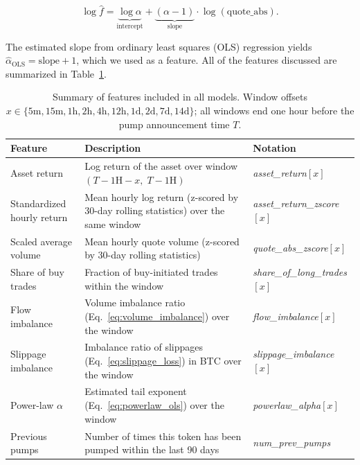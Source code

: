 \documentclass{ieeeaccess}
\begin{document}
\begin{equation}
    \log \hat{f} = \underbrace{\log \alpha}_{\text{intercept}} + \underbrace{(\alpha - 1)}_{\text{slope}} \cdot \log(\mathrm{quote\_abs}).
    \label{eq:powerlaw_ols}
\end{equation}

The estimated slope from ordinary least squares (OLS) regression yields $\hat{\alpha}_{\mathrm{OLS}} = \text{slope} + 1$, which we used as a feature. All of the features discussed are summarized in Table~\ref{table:feature_descriptions}.

\begin{table}[!t]
    \centering
    \small
    \renewcommand{\arraystretch}{1.25}
    \setlength{\tabcolsep}{10pt}
    \begin{tabular}{p{3cm}p{7cm}l}
        \toprule
        \textbf{Feature} & \textbf{Description} & \textbf{Notation} \\
        \midrule
        Asset return & Log return of the asset over window $(T{-}1\mathrm{H}{-}x,\; T{-}1\mathrm{H})$ & \textit{asset\_return}$[x]$ \\
        \midrule
        Standardized hourly return & Mean hourly log return (z-scored by 30-day rolling statistics) over the same window & \textit{asset\_return\_zscore}$[x]$ \\
        \midrule
        Scaled average volume & Mean hourly quote volume (z-scored by 30-day rolling statistics) & \textit{quote\_abs\_zscore}$[x]$ \\
        \midrule
        Share of buy trades & Fraction of buy-initiated trades within the window & \textit{share\_of\_long\_trades}$[x]$ \\
        \midrule
        Flow imbalance & Volume imbalance ratio (Eq.~\ref{eq:volume_imbalance}) over the window & \textit{flow\_imbalance}$[x]$ \\
        \midrule
        Slippage imbalance & Imbalance ratio of slippages (Eq.~\ref{eq:slippage_loss}) in BTC over the window & \textit{slippage\_imbalance}$[x]$ \\
        \midrule
        Power-law $\alpha$ & Estimated tail exponent (Eq.~\ref{eq:powerlaw_ols}) over the window & \textit{powerlaw\_alpha}$[x]$ \\
        \midrule
        Previous pumps & Number of times this token has been pumped within the last 90 days & \textit{num\_prev\_pumps} \\
        \bottomrule
    \end{tabular}
    \caption{Summary of features included in all models. Window offsets $x \in \{5\text{m}, 15\text{m}, 1\text{h}, 2\text{h}, 4\text{h}, 12\text{h}, 1\text{d}, 2\text{d}, 7\text{d}, 14\text{d}\}$; all windows end one hour before the pump announcement time $T$.}
    \label{table:feature_descriptions}
\end{table}
\end{document}
